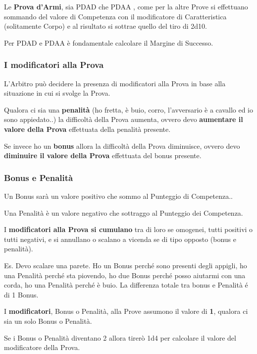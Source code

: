 \documentclass[12pt,a4paper,twoside,openany]{book}
\begin{document}
\begin{multicols}{2}
Le \textbf{Prova d'Armi}, sia PDAD che PDAA , come per la altre Prove si effettuano sommando del valore di Competenza con il modificatore di Caratteristica (solitamente Corpo) e al risultato si sottrae quello del tiro di 2d10.

Per PDAD e PDAA è fondamentale calcolare il Margine di Successo.

\subsubsection{I modificatori alla Prova}

L'Arbitro può decidere la presenza di modificatori alla Prova in base alla situazione in cui si svolge la Prova.

Qualora ci sia una \textbf{penalità} (ho fretta, è buio, corro, l'avversario è a cavallo ed io sono appiedato..) la difficoltà della Prova aumenta, ovvero devo \textbf{aumentare il valore della Prova} effettuata della penalità presente.

Se invece ho un \textbf{bonus} allora la difficoltà della Prova diminuisce, ovvero devo \textbf{diminuire il valore della Prova} effettuata del bonus presente.

\subsubsection{Bonus e Penalità}

Un Bonus sarà un valore positivo che sommo al Punteggio di Competenza..

Una Penalità è un valore negativo che sottraggo al Punteggio dei Competenza. 

I \textbf{modificatori alla Prova si cumulano} tra di loro se omogenei, tutti positivi o tutti negativi, e si annullano o scalano a vicenda se di tipo opposto (bonus e penalità).

Es. Devo scalare una parete. Ho un Bonus perché sono presenti degli appigli, ho una Penalità perché sta piovendo, ho due Bonus perché posso aiutarmi con una corda, ho una Penalità perché è buio. La differenza totale tra bonus e Penalità é di 1 Bonus.

I \textbf{modificatori}, Bonus o Penalità, alla Prove assumono il valore di \textbf{1}, qualora ci sia un solo Bonus o Penalità.

Se i Bonus o Penalità diventano 2 allora tirerò 1d4 per calcolare il valore del modificatore della Prova.


\end{multicols}
\end{document}
